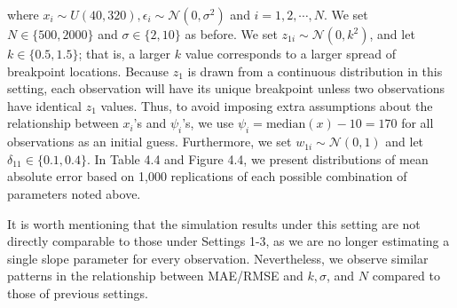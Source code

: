 \documentclass [12pt, proquest] {uwthesis}[2016/11/22]
\begin{document}
where $x_i \sim U(40, 320), \epsilon_i \sim \mathcal{N}(0, \sigma^2)$ and $i = 1, 2, \cdots, N$. We set $N \in \{500, 2000\}$ and $\sigma \in \{2, 10\}$ as before. We set $z_{1i} \sim \mathcal{N}(0, k^2)$, and let $k \in \{0.5, 1.5\}$; that is, a larger $k$ value corresponds to a larger spread of breakpoint locations. Because $z_1$ is drawn from a continuous distribution in this setting, each observation will have its unique breakpoint unless two observations have identical $z_1$ values. Thus, to avoid imposing extra assumptions about the relationship between $x_i$'s and $\psi_i$'s, we use $\psi_i = \text{median}(x) - 10 = 170$ for all observations as an initial guess. Furthermore, we set $w_{1i} \sim \mathcal{N}(0, 1)$ and let $\delta_{11} \in \{0.1, 0.4\}$. In Table 4.4 and Figure 4.4, we present distributions of mean absolute error based on 1,000 replications of each possible combination of parameters noted above.

It is worth mentioning that the simulation results under this setting are not directly comparable to those under Settings 1-3, as we are no longer estimating a single slope parameter for every observation. Nevertheless, we observe similar patterns in the relationship between MAE/RMSE and $k, \sigma$, and $N$ compared to those of previous settings.
\end{document}

